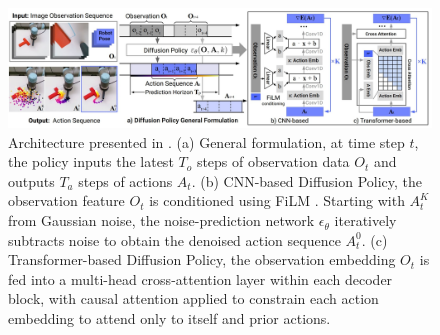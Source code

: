 \begin{figure}[t]
    \centering
    \includegraphics[width=\textwidth]{figures/images/diffusion_policy/diffusion_model.jpg}
    \caption{Architecture presented in \cite{cheng2023diffusion}. (a) General formulation, at time step $t$, the policy inputs the latest $T_o$ steps of observation data $O_t$ and outputs $T_a$ steps of actions $A_t$. (b) CNN-based Diffusion Policy, the observation feature $O_t$ is conditioned using FiLM \cite{perez2018film}. Starting with $A_t^K$ from Gaussian noise, the noise-prediction network $\epsilon_\theta$ iteratively subtracts noise to obtain the denoised action sequence $A_t^0$. (c) Transformer-based Diffusion Policy, the observation embedding $O_t$ is fed into a multi-head cross-attention layer within each decoder block, with causal attention applied to constrain each action embedding to attend only to itself and prior actions.}
    \label{fig:diffusion_model}
\end{figure}

